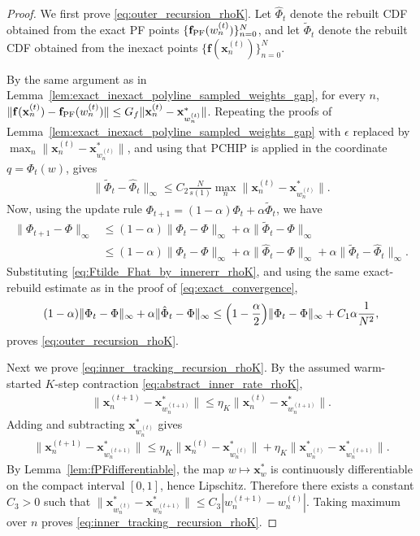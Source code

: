 \documentclass{article}
\newcommand{\bx}{\mathbf{x}}
\newcommand{\f}{\mathbf{f}}
\newcommand{\fPF}{{\mathbf{f}_{\rm PF}}}
\newcommand{\Farc}{\Phi}
\begin{document}
\begin{proof}
We first prove \eqref{eq:outer_recursion_rhoK}. Let $\hat \Farc_t$ denote the rebuilt CDF obtained from the exact PF points $\{\fPF(w_n^{(t)})\}_{n=0}^N$, and let $\tilde \Farc_t$ denote the rebuilt CDF obtained from the inexact points $\{\f(\bx_n^{(t)})\}_{n=0}^N$.

By the same argument as in Lemma~\ref{lem:exact_inexact_polyline_sampled_weights_gap}, for every $n$, $\|\f(\bx_n^{(t)})-\fPF(w_n^{(t)})\|\le G_f\|\bx_n^{(t)}-\bx_{w_n^{(t)}}^*\|$. Repeating the proofs of Lemma~\ref{lem:exact_inexact_polyline_sampled_weights_gap} with $\epsilon$ replaced by $\max_n\|\bx_n^{(t)}-\bx_{w_n^{(t)}}^*\|$, and using that PCHIP is applied in the coordinate $q=\Farc_t(w)$, gives
\begin{align}
\|\tilde \Farc_t-\hat \Farc_t\|_\infty \le C_2\frac{N}{s(1)}\max_n\|\bx_n^{(t)}-\bx_{w_n^{(t)}}^*\|.
\label{eq:Ftilde_Fhat_by_innererr_rhoK}
\end{align}
Now, using the update rule $\Farc_{t+1}=(1-\alpha)\Farc_t+\alpha\tilde \Farc_t$, we have
\begin{align}
\|\Farc_{t+1}-\Farc\|_\infty
&\le (1-\alpha)\|\Farc_t-\Farc\|_\infty+\alpha\|\tilde \Farc_t-\Farc\|_\infty \nonumber\\
&\le (1-\alpha)\|\Farc_t-\Farc\|_\infty+\alpha\|\hat \Farc_t-\Farc\|_\infty+\alpha\|\tilde \Farc_t-\hat \Farc_t\|_\infty.
\end{align}
Substituting \eqref{eq:Ftilde_Fhat_by_innererr_rhoK}, and using the same exact-rebuild estimate as in the proof of \eqref{eq:exact_convergence},
\begin{align}
(1-\alpha)\|\Farc_t-\Farc\|_\infty+\alpha\|\hat \Farc_t-\Farc\|_\infty \le \Bigl(1-\frac{\alpha}{2}\Bigr)\|\Farc_t-\Farc\|_\infty+C_1\alpha\frac{1}{N^2},
\end{align}
proves \eqref{eq:outer_recursion_rhoK}.

Next we prove \eqref{eq:inner_tracking_recursion_rhoK}. By the assumed warm-started $K$-step contraction \eqref{eq:abstract_inner_rate_rhoK},
\begin{align}
\|\bx_n^{(t+1)}-\bx_{w_n^{(t+1)}}^*\| \le \eta_K\|\bx_n^{(t)}-\bx_{w_n^{(t+1)}}^*\|.
\end{align}
Adding and subtracting $\bx_{w_n^{(t)}}^*$ gives
\begin{align}
\|\bx_n^{(t+1)}-\bx_{w_n^{(t+1)}}^*\| \le \eta_K\|\bx_n^{(t)}-\bx_{w_n^{(t)}}^*\|+\eta_K\|\bx_{w_n^{(t)}}^*-\bx_{w_n^{(t+1)}}^*\|.
\end{align}
By Lemma~\ref{lem:fPFdifferentiable}, the map $w\mapsto \bx_w^*$ is continuously differentiable on the compact interval $[0,1]$, hence Lipschitz. Therefore there exists a constant $C_3>0$ such that $\|\bx_{w_n^{(t)}}^*-\bx_{w_n^{(t+1)}}^*\|\le C_3|w_n^{(t+1)}-w_n^{(t)}|$. Taking maximum over $n$ proves \eqref{eq:inner_tracking_recursion_rhoK}.


\end{proof}
\end{document}
